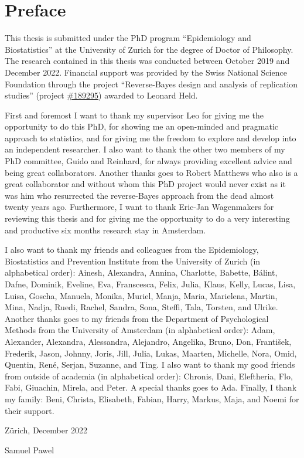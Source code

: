 \section*{Preface}

This thesis is submitted under the PhD program ``Epidemiology and
Biostatistics'' at the University of Zurich for the degree of Doctor of
Philosophy.
The research contained in this thesis was conducted between October 2019 and
December 2022. Financial support was provided by the Swiss National Science
Foundation through the project ``Reverse-Bayes design and analysis of
replication studies'' (project
\href{https://data.snf.ch/grants/grant/189295}{\#189295}) awarded to Leonard
Held.

First and foremost I want to thank my supervisor Leo for giving me the
opportunity to do this PhD, for showing me an open-minded and pragmatic approach
to statistics, and for giving me the freedom to explore and develop into an
independent researcher. I also want to thank the other two members of my PhD
committee, Guido and Reinhard, for always providing excellent advice and being
great collaborators. Another thanks goes to Robert Matthews who also is a great
collaborator and without whom this PhD project would never exist as it was him
who resurrected the reverse-Bayes approach from the dead almost twenty years
ago. Furthermore, I want to thank Eric-Jan Wagenmakers for reviewing this thesis
and for giving me the opportunity to do a very interesting and productive six
months research stay in Amsterdam.

I also want to thank my friends and colleagues from the Epidemiology,
Biostatistics and Prevention Institute from the University of Zurich (in
alphabetical order): Ainesh, Alexandra, Annina, Charlotte, Babette, Bálint,
Dafne, Dominik, Eveline, Eva, Franscesca, Felix, Julia, Klaus, Kelly, Lucas,
Lisa, Luisa, Goscha, Manuela, Monika, Muriel, Manja, Maria, Marielena, Martin,
Mina, Nadja, Ruedi, Rachel, Sandra, Sona, Steffi, Tala, Torsten, and Ulrike.
Another thanks goes to my friends from the Department of Psychological Methods
from the University of Amsterdam (in alphabetical order): Adam, Alexander,
Alexandra, Alessandra, Alejandro, Angelika, Bruno, Don, František, Frederik,
Jason, Johnny, Joris, Jill, Julia, Lukas, Maarten, Michelle, Nora, Omid,
Quentin, René, Serjan, Suzanne, and Ting. I also want to thank my good friends
from outside of academia (in alphabetical order): Chronis, Dani, Eleftheria,
Flo, Fabi, Giuachin, Mirela, and Peter. A special thanks goes to Ada. Finally, I
thank my family: Beni, Christa, Elisabeth, Fabian, Harry, Markus, Maja, and
Noemi for their support.

\begin{flushright}
  \hfill Zürich, December 2022

  \hfill Samuel Pawel
\end{flushright}

